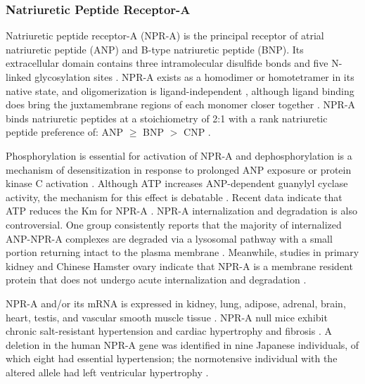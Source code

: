 \documentclass[14pt,a4paper,onecolumn]{extarticle}
\begin{document}
\subsubsection{Natriuretic Peptide Receptor-A}
Natriuretic peptide receptor-A (NPR-A) is the principal receptor of atrial natriuretic peptide (ANP) and B-type natriuretic peptide (BNP). Its extracellular domain contains three intramolecular disulfide bonds and five N-linked glycosylation sites \citep{Miyagi2000a}.
NPR-A exists as a homodimer or homotetramer in its native state, and oligomerization is ligand-independent \citep{Chinkers1992} \citep{Iwata1991}, although ligand binding does bring the juxtamembrane regions of each monomer closer together \citep{Labrecque2001}.
NPR-A binds natriuretic peptides at a stoichiometry of 2:1 with a rank natriuretic peptide preference of: ANP $\ge$ BNP $>$ CNP \citep{Bennett1991} \citep{Koller1991} \citep{Suga1992a}.  %

Phosphorylation is essential for activation of NPR-A and dephosphorylation is a mechanism of desensitization in response to prolonged ANP exposure or protein kinase C activation \citep{Potter1992} \citep{Potter1994}. Although ATP increases ANP-dependent guanylyl cyclase activity, the mechanism for this effect is debatable \citep{Antos2005} \citep{Antos2007} \citep{Burczynska2007} \citep{Joubert2005}.
Recent data indicate that ATP reduces the Km for NPR-A \citep{Antos2007}. NPR-A internalization and degradation is also controversial. One group consistently reports that the majority of internalized ANP-NPR-A complexes are degraded via a lysosomal pathway with a small portion returning intact to the plasma membrane \citep{Pandey2002}. Meanwhile, studies in primary kidney and Chinese Hamster ovary indicate that NPR-A is a membrane resident protein that does not undergo acute internalization and degradation \citep{Fan2005} \citep{Koh1992} \citep{Vieira2001}.

NPR-A and/or its mRNA is expressed in kidney, lung, adipose, adrenal, brain, heart, testis, and vascular smooth muscle tissue \citep{Goy2001} \citep{Lowe1989} \citep{Nagase1997} \citep{Wilcox1991}. NPR-A null mice exhibit chronic salt-resistant hypertension and cardiac hypertrophy and fibrosis \citep{Kuhn2002} \citep{Lopez1995} \citep{Oliver1997}.
A deletion in the human NPR-A gene was identified in nine Japanese individuals, of which eight had essential hypertension; the normotensive individual with the altered allele had left ventricular hypertrophy \citep{Nakayama2000}.  %
\end{document}
